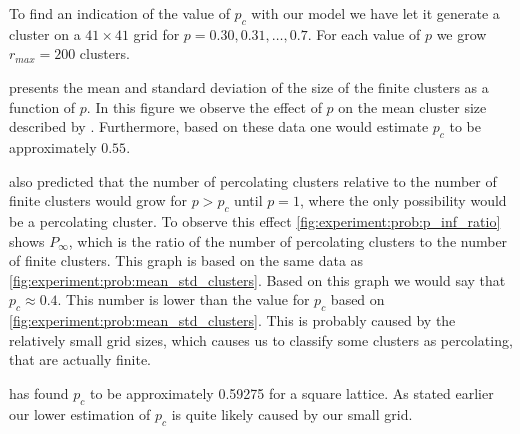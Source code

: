 To find an indication of the value of $p_c$ with our model we have let it generate a cluster on a $41 \times 41$ grid for $p = 0.30, 0.31, \dotsc, 0.7$. For each value of $p$ we grow $r_{max} = 200$ clusters. 

 presents the mean and standard deviation of the size of the finite clusters as a function of $p$. In this figure we observe the effect of $p$ on the mean cluster size described by \citeauthor{kenzel1997physics}. Furthermore, based on these data one would estimate $p_c$ to be approximately $0.55$. 

\citeauthor{kenzel1997physics} also predicted that the number of percolating clusters relative to the number of finite clusters would grow for $p > p_c$ until $p = 1$, where the only possibility would be a percolating cluster. To observe this effect \cref{fig:experiment:prob:p_inf_ratio} shows $P_\infty$, which is the ratio of the number of percolating clusters to the number of finite clusters. This graph is based on the same data as \cref{fig:experiment:prob:mean_std_clusters}. Based on this graph we would say that $p_c \approx 0.4$. This number is lower than the value for $p_c$ based on \cref{fig:experiment:prob:mean_std_clusters}. This is probably caused by the relatively small grid sizes, which causes us to classify some clusters as percolating, that are actually finite. 

\textcite{stauffer1994introduction} has found $p_c$ to be approximately \num{0.59275} for a square lattice. As stated earlier our lower estimation of $p_c$ is quite likely caused by our small grid. 
